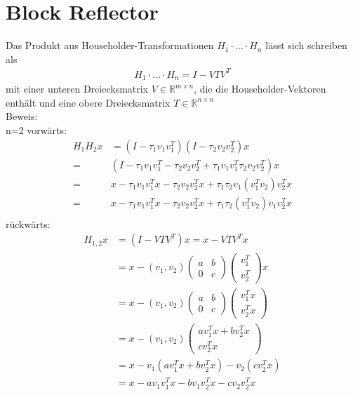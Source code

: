 \chapter{Block Reflector}
Das Produkt aus Householder-Transformationen $H_1 \cdot ... \cdot H_n$ lässt sich schreiben als 
\begin{align*}
	H_1 \cdot ... \cdot H_n = I - VTV^T
\end{align*}
mit einer unteren Dreiecksmatrix $V \in \mathbb{R}^{m \times n}$, die die Householder-Vektoren enthält und eine obere Dreiecksmatrix $T \in \mathbb{R}^{n \times n}$ \cite{Joffrain:2006:AHT:1141885.1141886}\\
Beweis:\\
n=2
vorwärts: 
\begin{align*}
	H_1 H_2 x &= (I-\tau_1 v_1 v_1^T)(I-\tau_2 v_2 v_2^T)x\\
	= &(I - \tau_1 v_1 v_1^T - \tau_2 v_2 v_2^T +  \tau_1 v_1 v_1^T \tau_2 v_2 v_2^T )x\\
  = &x - \tau_1 v_1 v_1^T x - \tau_2 v_2 v_2^T x + \tau_1 \tau_2 v_1 (v_1^T v_2 )v_2^T x\\
  = &x - \tau_1 v_1 v_1^T x - \tau_2 v_2 v_2^T x + \tau_1 \tau_2 (v_1^T v_2 ) v_1 v_2^T x\\
\end{align*}
rückwärts:
\begin{align*}
H_{1,2} x &= (I - V T V^T) x = x - V T V^T x\\
&= x - (v_1, v_2)
\begin{pmatrix}
a & b \\ 0 & c
\end{pmatrix}
\begin{pmatrix}
v_1^T \\ v_2^T 
\end{pmatrix}
x\\
&= x - (v_1, v_2)
\begin{pmatrix}
a & b \\ 0 & c
\end{pmatrix}
\begin{pmatrix}
v_1^T x \\ v_2^T x
\end{pmatrix}\\
&= x - (v_1, v_2)
\begin{pmatrix}
a v_1^T x + b v_2^T x\\  c v_2^T x
\end{pmatrix}\\
&= x - v_1(a v_1^T x + b v_2^T x) - v_2 (c v_2^T x)\\
&= x - a v_1 v_1^T x - b v_1 v_2^T x - c v_2 v_2^T x
\end{align*}
